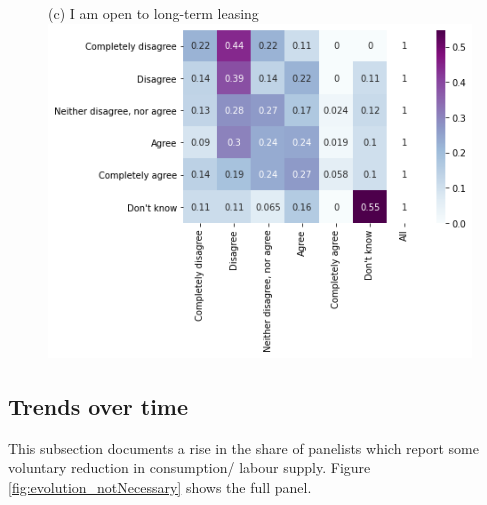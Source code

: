 \documentclass[12pt]{article}
\begin{document}
\begin{figure}[h!!]
\begin{minipage}[h!!]{0.32\textwidth}
	\end{minipage}
	\begin{minipage}[h!!]{0.32\textwidth}  
		\centering\footnotesize{(c) I am open to long-term leasing}
		\includegraphics[width=1\textwidth]{../codding_data/results/liss/conditional_heatmap183_141labels0.png}
	\end{minipage}
\end{figure}
\newpage
\subsection{Trends over time}\label{subsec:trends}

This subsection documents a rise in the share of panelists which report some voluntary reduction in consumption/ labour supply. Figure \ref{fig:evolution_notNecessary} shows the full panel.  
\end{document}
